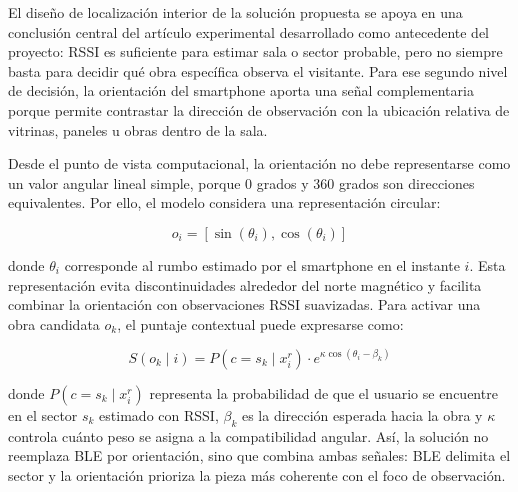 El dise\~no de localizaci\'on interior de la soluci\'on propuesta se apoya en una conclusi\'on central del art\'iculo experimental desarrollado como antecedente del proyecto: RSSI es suficiente para estimar sala o sector probable, pero no siempre basta para decidir qu\'e obra espec\'ifica observa el visitante. Para ese segundo nivel de decisi\'on, la orientaci\'on del smartphone aporta una se\~nal complementaria porque permite contrastar la direcci\'on de observaci\'on con la ubicaci\'on relativa de vitrinas, paneles u obras dentro de la sala.

Desde el punto de vista computacional, la orientaci\'on no debe representarse como un valor angular lineal simple, porque 0 grados y 360 grados son direcciones equivalentes. Por ello, el modelo considera una representaci\'on circular:

\[
    o_i = [\sin(\theta_i), \cos(\theta_i)]
\]

donde \(\theta_i\) corresponde al rumbo estimado por el smartphone en el instante \(i\). Esta representaci\'on evita discontinuidades alrededor del norte magn\'etico y facilita combinar la orientaci\'on con observaciones RSSI suavizadas. Para activar una obra candidata \(o_k\), el puntaje contextual puede expresarse como:

\[
    S(o_k \mid i) = P(c=s_k \mid x_i^r) \cdot e^{\kappa \cos(\theta_i-\beta_k)}
\]

donde \(P(c=s_k \mid x_i^r)\) representa la probabilidad de que el usuario se encuentre en el sector \(s_k\) estimado con RSSI, \(\beta_k\) es la direcci\'on esperada hacia la obra y \(\kappa\) controla cu\'anto peso se asigna a la compatibilidad angular. As\'i, la soluci\'on no reemplaza BLE por orientaci\'on, sino que combina ambas se\~nales: BLE delimita el sector y la orientaci\'on prioriza la pieza m\'as coherente con el foco de observaci\'on.

